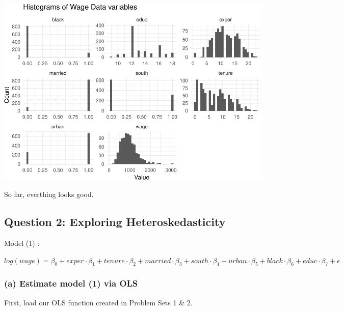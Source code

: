 \documentclass[11pt,]{article}
\begin{document}
\includegraphics{ps3_code_files/figure-latex/plot_series-1.pdf}

So far, everthing looks good.

\subsection{Question 2: Exploring
Heteroskedasticity}\label{question-2-exploring-heteroskedasticity}

Model (1) :

\(log(wage) = \beta_0 + exper \cdot \beta_1 + tenure \cdot \beta_2 + married \cdot \beta_3 + south \cdot \beta_4 + urban \cdot \beta_5 + black \cdot \beta_6 + educ \cdot \beta_7 + \epsilon\)

\subsubsection{(a) Estimate model (1) via
OLS}\label{a-estimate-model-1-via-ols}

First, load our OLS function created in Problem Sets 1 \& 2.
\end{document}
